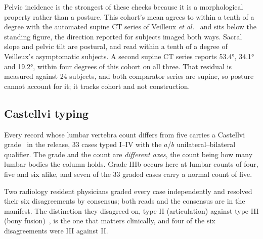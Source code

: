 \documentclass[aapm,mph,amsmath,amssymb,preprint,linenumbers]{revtex4-2}
\begin{document}
Pelvic incidence is the strongest of these checks
because it is a morphological property rather than a posture. This cohort's mean agrees to
within a tenth of a degree with the automated supine CT series of Veilleux \emph{et
al.}~\cite{veilleux2020} and sits below the standing figure, the direction reported for subjects
imaged both ways.\cite{leeliu2022} Sacral slope and pelvic tilt are postural, and read within a tenth of a degree of Veilleux's asymptomatic subjects. A second supine CT series reports
53.4\si{\degree}, 34.1\si{\degree} and 19.2\si{\degree}, within four degrees of this cohort on all
three.\cite{hasegawa2018} That residual is measured against 24 subjects, and both comparator
series are supine, so posture cannot account for it; it tracks cohort and not construction.

\subsection{Castellvi typing}

Every record whose lumbar vertebra count differs from five carries a Castellvi
grade~\cite{castellvi1984} in the release, 33 cases typed I--IV with the $a$/$b$
unilateral--bilateral qualifier. The grade and the count are \emph{different axes}, the count
being how many lumbar bodies the column holds. Grade IIIb occurs here at lumbar counts of four,
five and six alike, and seven of the 33 graded cases carry a normal count of five.

Two radiology resident physicians graded every case independently and resolved their six
disagreements by consensus; both reads and the consensus are in the manifest. The distinction
they disagreed on, type II (articulation) against type III (bony fusion)~\cite{koninwalz2010}, is
the one that matters clinically, and four of the six disagreements were III against II.
\end{document}
